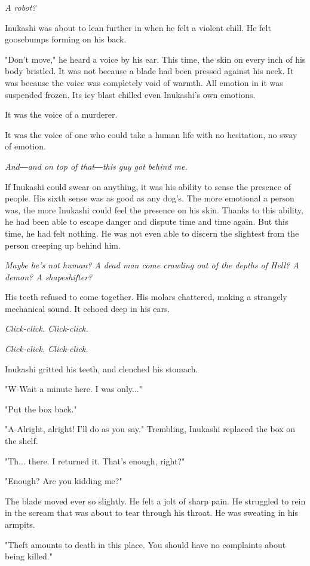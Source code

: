 \emph{A robot?}

Inukashi was about to lean further in when he felt a violent chill. He
felt goosebumps forming on his back.

"Don't move," he heard a voice by his ear. This time, the skin on every
inch of his body bristled. It was not because a blade had been pressed
against his neck. It was because the voice was completely void of
warmth. All emotion in it was suspended frozen. Its icy blast chilled
even Inukashi's own emotions.

It was the voice of a murderer.

It was the voice of one who could take a human life with no hesitation,
no sway of emotion.

\emph{And―and on top of that―this guy got behind me.}

If Inukashi could swear on anything, it was his ability to sense the
presence of people. His sixth sense was as good as any dog's. The more
emotional a person was, the more Inukashi could feel the presence on his
skin. Thanks to this ability, he had been able to escape danger and
dispute time and time again. But this time, he had felt nothing. He was
not even able to discern the slightest from the person creeping up
behind him.

\emph{Maybe he's not human? A dead man come crawling out of the depths of
Hell? A demon? A shapeshifter?}

His teeth refused to come together. His molars chattered, making a
strangely mechanical sound. It echoed deep in his ears.

\emph{Click-click. Click-click.}

\emph{Click-click. Click-click.}

Inukashi gritted his teeth, and clenched his stomach.

"W-Wait a minute here. I was only..."

"Put the box back."

"A-Alright, alright! I'll do as you say." Trembling, Inukashi replaced
the box on the shelf.

"Th... there. I returned it. That's enough, right?"

"Enough? Are you kidding me?"

The blade moved ever so slightly. He felt a jolt of sharp pain. He
struggled to rein in the scream that was about to tear through his
throat. He was sweating in his armpits.

"Theft amounts to death in this place. You should have no complaints
about being killed."

